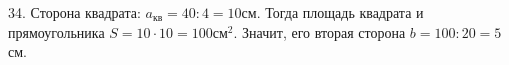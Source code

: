 34. Сторона квадрата: $a_{\text{кв}}=40:4=10$см. Тогда площадь квадрата и прямоугольника $S=10\cdot10=100\text{см}^2.$ Значит, его вторая сторона $b=100:20=5$см.\\
